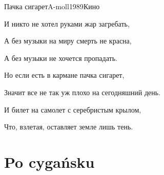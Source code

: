 \documentclass[a4paper,draft]{book}
\begin{document}
\begin{otherlanguage}{russian}
\begin{song}{Пачка сигарет}{A-moll}{1989}{Кино}{}{}
\begin{SBVerse}
	И никто не хотел руками жар загребать,
	
	А без музыки на миру смерть не красна,
	
	А без музыки не хочется пропадать.
\end{SBVerse}

\begin{SBChorus}
	Но если есть в кармане пачка сигарет,
	
	Значит все не так уж плохо на сегодняшний день.
	
	И билет на самолет с серебристым крылом,
	
	Что, взлетая, оставляет земле лишь тень. 
\end{SBChorus}

\end{song}

\end{otherlanguage}

\chapter{Po cygańsku}
\end{document}
